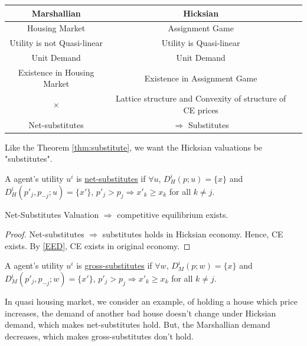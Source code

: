 \documentclass[11pt]{elegantbook}
\begin{document}
\begin{center}
    \begin{tabular}{ccc}
        \hline
            Marshallian& Hicksian\\
        \hline
            Housing Market & Assignment Game\\
            Utility is not Quasi-linear & Utility is Quasi-linear\\
            Unit Demand& Unit Demand\\
            Existence in Housing Market& Existence in Assignment Game\\
            $\times$& Lattice structure and Convexity of structure of CE prices\\
            Net-substitutes& $\Rightarrow$ Substitutes\\
        \hline
    \end{tabular}
\end{center}

Like the Theorem \ref{thm:substitute}, we want the Hicksian valuations be "substitutes".
\begin{definition}
    \normalfont
    A agent's utility $u^i$ is \underline{net-substitutes} if $\forall u$, $D^i_H(p;u)=\{x\}$ and $D^i_H(p'_j,p_{-j};u)=\{x'\}$, $p'_j>p_j \Rightarrow x'_k\geq x_k$ for all $k\neq j$.
\end{definition}

\begin{theorem}
    Net-Substitutes Valuation $\Rightarrow$ competitive equilibrium exists.
\end{theorem}
\begin{proof}
    Net-substitutes $\Rightarrow$ substitutes holds in Hicksian economy. Hence, CE exists. By \ref{EED}, CE exists in original economy.
\end{proof}

\begin{definition}
    \normalfont
    A agent's utility $u^i$ is \underline{gross-substitutes} if $\forall w$, $D^i_M(p;w)=\{x\}$ and $D^i_M(p'_j,p_{-j};w)=\{x'\}$, $p'_j>p_j \Rightarrow x'_k\geq x_k$ for all $k\neq j$.
\end{definition}

\begin{example}
    In quasi housing market, we consider an example, of holding a house which price increases, the demand of another bad house doesn't change under Hicksian demand, which makes net-substitutes hold. But, the Marshallian demand decreases, which makes gross-substitutes don't hold.
\end{example}
\end{document}
